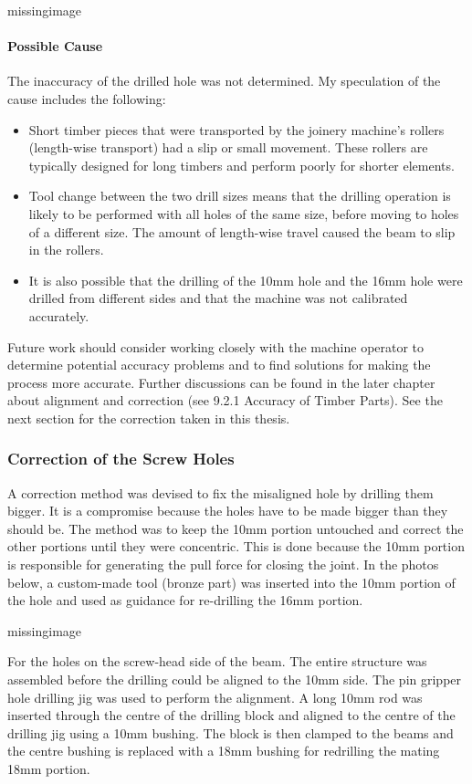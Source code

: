 missingimage

\paragraph{Possible Cause}
The inaccuracy of the drilled hole was not determined. My speculation of the cause includes the following:
\begin{itemize}
    \item Short timber pieces that were transported by the joinery machine’s rollers (length-wise transport) had a slip or small movement. These rollers are typically designed for long timbers and perform poorly for shorter elements.
    \item Tool change between the two drill sizes means that the drilling operation is likely to be performed with all holes of the same size, before moving to holes of a different size. The amount of length-wise travel caused the beam to slip in the rollers.
    \item It is also possible that the drilling of the 10mm hole and the 16mm hole were drilled from different sides and that the machine was not calibrated accurately.
\end{itemize}

Future work should consider working closely with the machine operator to determine potential accuracy problems and to find solutions for making the process more accurate. Further discussions can be found in the later chapter about alignment and correction (see 9.2.1 Accuracy of Timber Parts).
See the next section for the correction taken in this thesis.

\subsubsection{Correction of the Screw Holes}
A correction method was devised to fix the misaligned hole by drilling them bigger. It is a compromise because the holes have to be made bigger than they should be. 
The method was to keep the 10mm portion untouched and correct the other portions until they were concentric. This is done because the 10mm portion is responsible for generating the pull force for closing the joint. In the photos below, a custom-made tool (bronze part) was inserted into the 10mm portion of the hole and used as guidance for re-drilling the 16mm portion.

missingimage

For the holes on the screw-head side of the beam. The entire structure was assembled before the drilling could be aligned to the 10mm side. The pin gripper hole drilling jig was used to perform the alignment. A long 10mm rod was inserted through the centre of the drilling block and aligned to the centre of the drilling jig using a 10mm bushing. The block is then clamped to the beams and the centre bushing is replaced with a 18mm bushing for redrilling the mating 18mm portion. 

